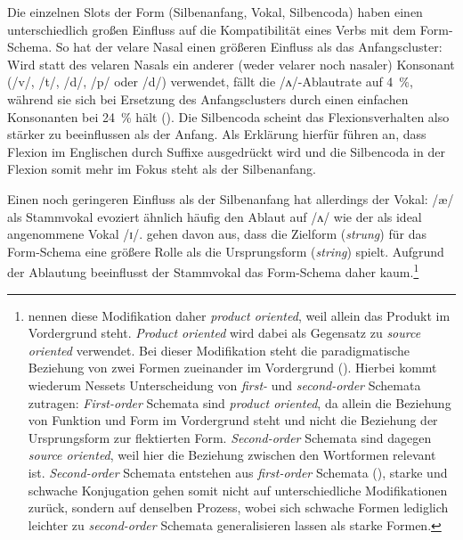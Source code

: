 Die einzelnen Slots der Form (Silbenanfang, Vokal, Silbencoda) haben einen unterschiedlich großen Einfluss auf die Kompatibilität eines Verbs mit dem Form-Schema. So hat der velare Nasal einen größeren Einfluss als das Anfangscluster: Wird statt des velaren Nasals ein anderer (weder velarer noch nasaler) Konsonant (/v/, /t/, /d/, /p/ oder /d/) verwendet, fällt die /ʌ/-Ablautrate auf 4~\%, während sie sich bei Ersetzung des Anfangsclusters durch einen einfachen Konsonanten bei 24~\% hält (\cite[261]{Bybee.1983}). Die Silbencoda scheint das Flexionsverhalten also stärker zu beeinflussen als der Anfang. Als Erklärung hierfür führen \textcite[264]{Bybee.1983} an, dass Flexion im Englischen durch Suffixe ausgedrückt wird und die Silbencoda in der Flexion somit mehr im Fokus steht als der Silbenanfang.



 Einen noch geringeren Einfluss als der Silbenanfang hat allerdings der Vokal: /\ae/ als Stammvokal evoziert ähnlich häufig den Ablaut auf /ʌ/ wie der als ideal angenommene Vokal /ɪ/. \textcite[255--256]{Bybee.1983} gehen davon aus, dass die Zielform (\textit{strung}) für das Form-Schema eine größere Rolle als die Ursprungsform (\textit{string}) spielt. Aufgrund der Ablautung beeinflusst der Stammvokal das Form-Schema daher kaum.\footnote{\textcite[255--256]{Bybee.1983} nennen diese Modifikation daher \textit{product oriented}, weil allein das Produkt im Vordergrund steht.  \textit{Product oriented} wird dabei als Gegensatz zu \textit{source oriented} verwendet. Bei dieser Modifikation steht die paradigmatische Beziehung von zwei Formen zueinander im Vordergrund (\cite[171]{Bybee.2007}). Hierbei kommt wiederum Nessets Unterscheidung von \textit{first-} und \textit{second-order} Schemata zutragen: \textit{First-order} Schemata sind \textit{product oriented}, da allein die Beziehung von Funktion und Form im Vordergrund steht und nicht die Beziehung der Ursprungsform zur flektierten Form. \textit{Second-order} Schemata sind dagegen \textit{source oriented}, weil hier die Beziehung zwischen den Wortformen relevant ist. \textit{Second-order} Schemata entstehen aus \textit{first-order} Schemata (\cite[77]{Kopcke.2021}), starke und schwache Konjugation gehen somit nicht auf unterschiedliche Modifikationen zurück, sondern auf denselben Prozess, wobei sich schwache Formen lediglich leichter zu \textit{second-order} Schemata generalisieren lassen als starke Formen.  } 



